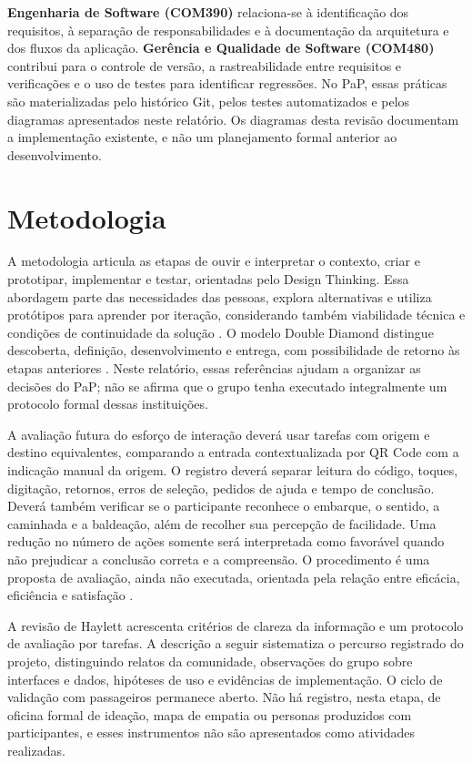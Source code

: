 \documentclass[12pt,oneside,a4paper,brazil,chapter=TITLE]{abntex2}
\let\papsection\section
\renewcommand{\section}{\clearpage\papsection}
\begin{document}
\textbf{Engenharia de Software (COM390)} relaciona-se à identificação dos requisitos, à separação de responsabilidades e à documentação da arquitetura e dos fluxos da aplicação. \textbf{Gerência e Qualidade de Software (COM480)} contribui para o controle de versão, a rastreabilidade entre requisitos e verificações e o uso de testes para identificar regressões. No PaP, essas práticas são materializadas pelo histórico Git, pelos testes automatizados e pelos diagramas apresentados neste relatório. Os diagramas desta revisão documentam a implementação existente, e não um planejamento formal anterior ao desenvolvimento.

\section{Metodologia}

\clearpage
A metodologia articula as etapas de ouvir e interpretar o contexto, criar e prototipar, implementar e testar, orientadas pelo Design Thinking. Essa abordagem parte das necessidades das pessoas, explora alternativas e utiliza protótipos para aprender por iteração, considerando também viabilidade técnica e condições de continuidade da solução \citep{ideo-designthinking}. O modelo Double Diamond distingue descoberta, definição, desenvolvimento e entrega, com possibilidade de retorno às etapas anteriores \citep{designcouncil}. Neste relatório, essas referências ajudam a organizar as decisões do PaP; não se afirma que o grupo tenha executado integralmente um protocolo formal dessas instituições.

A avaliação futura do esforço de interação deverá usar tarefas com origem e destino equivalentes, comparando a entrada contextualizada por QR Code com a indicação manual da origem. O registro deverá separar leitura do código, toques, digitação, retornos, erros de seleção, pedidos de ajuda e tempo de conclusão. Deverá também verificar se o participante reconhece o embarque, o sentido, a caminhada e a baldeação, além de recolher sua percepção de facilidade. Uma redução no número de ações somente será interpretada como favorável quando não prejudicar a conclusão correta e a compreensão. O procedimento é uma proposta de avaliação, ainda não executada, orientada pela relação entre eficácia, eficiência e satisfação \citep{iso924111}.

A revisão de Haylett acrescenta critérios de clareza da informação e um protocolo de avaliação por tarefas. A descrição a seguir sistematiza o percurso registrado do projeto, distinguindo relatos da comunidade, observações do grupo sobre interfaces e dados, hipóteses de uso e evidências de implementação. O ciclo de validação com passageiros permanece aberto. Não há registro, nesta etapa, de oficina formal de ideação, mapa de empatia ou personas produzidos com participantes, e esses instrumentos não são apresentados como atividades realizadas.
\end{document}
